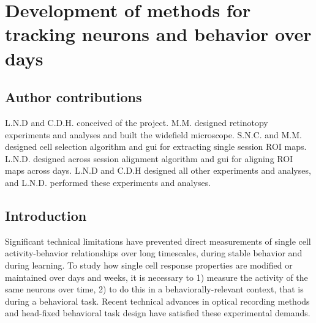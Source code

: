 \chapter{Development of methods for tracking neurons and behavior over days}

\section{Author contributions}
L.N.D and C.D.H. conceived of the project. M.M. designed retinotopy experiments and analyses and built the widefield microscope. S.N.C. and M.M. designed cell selection algorithm and gui for extracting single session ROI maps. L.N.D. designed across session alignment algorithm and gui for aligning ROI maps across days. L.N.D and C.D.H designed all other experiments and analyses, and L.N.D. performed these experiments and analyses. 

\section{Introduction}
Significant technical limitations have prevented direct measurements of single cell activity-behavior relationships over long timescales, during stable behavior and during learning. To study how single cell response properties are modified or maintained over days and weeks, it is necessary to 1) measure the activity of the same neurons over time, 2) to do this in a behaviorally-relevant context, that is during a behavioral task. Recent technical advances in optical recording methods and head-fixed behavioral task design have satisfied these experimental demands.

